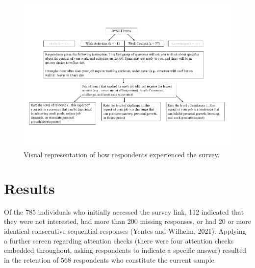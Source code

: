 \documentclass[
  man]{apa7}
\begin{document}
\begin{figure}
\centering
\includegraphics{Submission_files/figure-latex/onetviz-1.pdf}
\caption{\label{fig:onetviz}Visual representation of how respondents experienced the survey.}
\end{figure}

\hypertarget{results}{%
\section{Results}\label{results}}

Of the 785 individuals who initially accessed the survey link, 112 indicated that they were not interested, had more than 200 missing responses, or had 20 or more identical consecutive sequential responses (Yentes and Wilhelm, 2021). Applying a further screen regarding attention checks (there were four attention checks embedded throughout, asking respondents to indicate a specific answer) resulted in the retention of 568 respondents who constitute the current sample.
\end{document}
